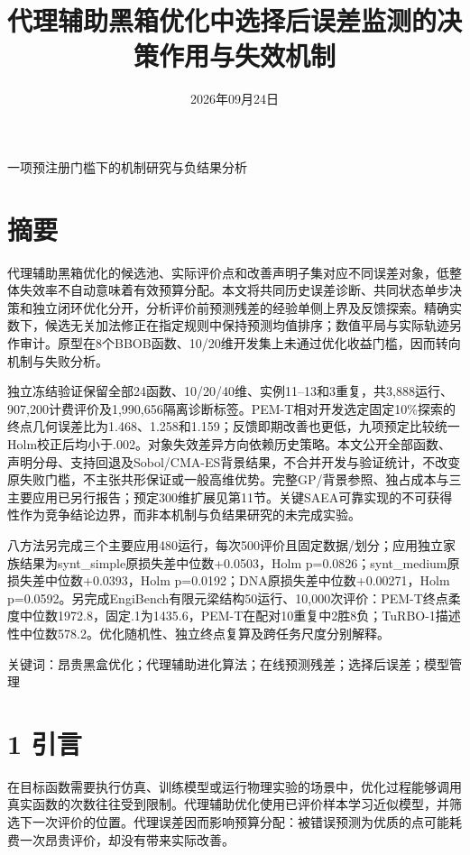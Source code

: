 \documentclass[11pt,a4paper]{article}
\title{代理辅助黑箱优化中选择后误差监测的决策作用与失效机制}
\author{}
\date{2026年09月24日}
\begin{document}
\maketitle
\begin{center}一项预注册门槛下的机制研究与负结果分析\end{center}
\hypertarget{ux6458ux8981}{%
\section{摘要}\label{ux6458ux8981}}

代理辅助黑箱优化的候选池、实际评价点和改善声明子集对应不同误差对象，低整体失效率不自动意味着有效预算分配。本文将共同历史误差诊断、共同状态单步决策和独立闭环优化分开，分析评价前预测残差的经验单侧上界及反馈探索。精确实数下，候选无关加法修正在指定规则中保持预测均值排序；数值平局与实际轨迹另作审计。原型在8个BBOB函数、10/20维开发集上未通过优化收益门槛，因而转向机制与失败分析。

独立冻结验证保留全部24函数、10/20/40维、实例11--13和3重复，共3,888运行、907,200计费评价及1,990,656隔离诊断标签。PEM-T相对开发选定固定10\%探索的终点几何误差比为1.468、1.258和1.159；反馈即期改善也更低，九项预定比较统一Holm校正后均小于.002。对象失效差异方向依赖历史策略。本文公开全部函数、声明分母、支持回退及Sobol/CMA-ES背景结果，不合并开发与验证统计，不改变原失败门槛，不主张共形保证或一般高维优势。完整GP/背景参照、独占成本与三主要应用已另行报告；预定300维扩展见第11节。关键SAEA可靠实现的不可获得性作为竞争结论边界，而非本机制与负结果研究的未完成实验。

八方法另完成三个主要应用480运行，每次500评价且固定数据/划分；应用独立家族结果为synt\_simple原损失差中位数+0.0503，Holm
p=0.0826；synt\_medium原损失差中位数+0.0393，Holm
p=0.0192；DNA原损失差中位数+0.00271，Holm
p=0.0592。另完成EngiBench有限元梁结构50运行、10,000次评价：PEM-T终点柔度中位数1972.8，固定.1为1435.6，PEM-T在配对10重复中2胜8负；TuRBO-1描述性中位数578.2。优化随机性、独立终点复算及跨任务尺度分别解释。

关键词：昂贵黑盒优化；代理辅助进化算法；在线预测残差；选择后误差；模型管理

\hypertarget{ux5f15ux8a00}{%
\section{1 引言}\label{ux5f15ux8a00}}

在目标函数需要执行仿真、训练模型或运行物理实验的场景中，优化过程能够调用真实函数的次数往往受到限制。代理辅助优化使用已评价样本学习近似模型，并筛选下一次评价的位置。代理误差因而影响预算分配：被错误预测为优质的点可能耗费一次昂贵评价，却没有带来实际改善。
\end{document}

